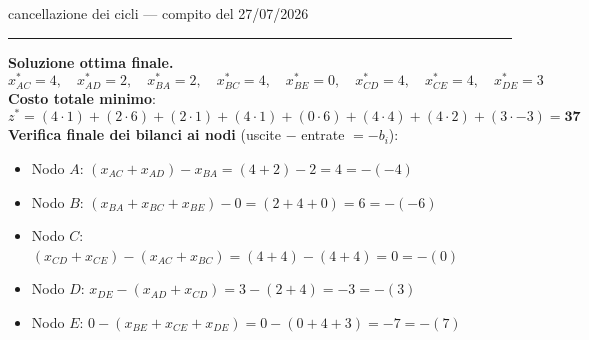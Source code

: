 \documentclass[11pt,a4paper]{article}
\newcommand{\mcfnodes}{%
  \node[nd] (A) at (0,2.1) {$A$};
  \node[nd] (B) at (0,-2.1) {$B$};
  \node[nd] (C) at (3.0,0) {$C$};
  \node[nd] (D) at (6.0,2.1) {$D$};
  \node[nd] (E) at (6.0,-2.1) {$E$};}
\newcommand{\ra}[4]{\draw[#1,thick,black!65] (#2) -- node[font=\scriptsize,black!70,fill=amber!5,inner sep=1pt]{$#4$} (#3);}
\newcommand{\fa}[4]{\draw[->,thick,black!45] (#1) -- node[font=\scriptsize,black!55,sloped,above,inner sep=1.5pt]{$#3$} node[font=\small,teal,sloped,below,inner sep=1.5pt]{$\mathbf{#4}$} (#2);}
\begin{document}
\begin{es}{cancellazione dei cicli --- compito del 27/07/2026}
\begin{center}
\begin{minipage}[t]{0.48\textwidth}\centering
{}
\par\vspace{1mm}{\scriptsize $G_x$ finale: privo di cicli orientati negativi}
\end{minipage}\hfill
\begin{minipage}[t]{0.48\textwidth}\centering
{}
\par{}
\end{minipage}
\end{center}

\medskip
\hrule
\medskip

\textbf{Soluzione ottima finale.}
\[
x_{AC}^* = 4,\quad x_{AD}^* = 2,\quad x_{BA}^* = 2,\quad x_{BC}^* = 4,\quad x_{BE}^* = 0,
\quad x_{CD}^* = 4,\quad x_{CE}^* = 4,\quad x_{DE}^* = 3
\]
\textbf{Costo totale minimo}:
\[
z^* = (4\cdot 1) + (2\cdot 6) + (2\cdot 1) + (4\cdot 1) + (0\cdot 6) + (4\cdot 4) + (4\cdot 2) + (3\cdot -3) = \mathbf{37}
\]
\textbf{Verifica finale dei bilanci ai nodi} (uscite $-$ entrate $= -b_i$):
\begin{itemize}[itemsep=0.15em]
\item Nodo $A$: $(x_{AC} + x_{AD}) - x_{BA} = (4 + 2) - 2 = 4 = -(-4)$ \quad \checkmark
\item Nodo $B$: $(x_{BA} + x_{BC} + x_{BE}) - 0 = (2 + 4 + 0) = 6 = -(-6)$ \quad \checkmark
\item Nodo $C$: $(x_{CD} + x_{CE}) - (x_{AC} + x_{BC}) = (4 + 4) - (4 + 4) = 0 = -(0)$ \quad \checkmark
\item Nodo $D$: $x_{DE} - (x_{AD} + x_{CD}) = 3 - (2 + 4) = -3 = -(3)$ \quad \checkmark
\item Nodo $E$: $0 - (x_{BE} + x_{CE} + x_{DE}) = 0 - (0 + 4 + 3) = -7 = -(7)$ \quad \checkmark
\end{itemize}
\end{es}
\end{document}

